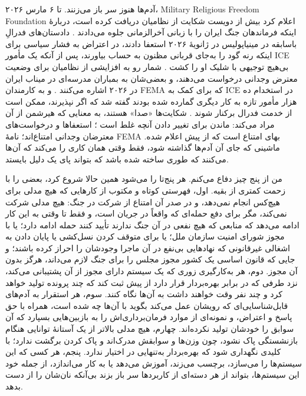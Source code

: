 آدم‌ها هنوز سر باز می‌زنند. تا ۶ مارس ۲۰۲۶، Military Religious Freedom Foundation اعلام کرد بیش از دویست شکایت از نظامیان دریافت کرده است، دربارهٔ اینکه فرماندهان جنگ ایران را با زبانی آخرالزمانی جلوه می‌دادند \autocite{Snopes2026MRFF}. دادستان‌های فدرالِ باسابقه در مینیاپولیس در ژانویهٔ ۲۰۲۶ استعفا دادند، در اعتراض به فشار سیاسی برای اینکه رنه گود را به‌جای قربانی مظنون به حساب بیاورند، پس از آنکه یک مأمور ICE بی‌هیچ توجیهی با شلیک او را کشت \autocite{Kaplan2026MinnProsecutors,CBS2026MinnFraudProsecutors,Wikipedia2026ReneeGood}. شمار رو به افزایشی از نظامیان برای وضعیت معترض وجدانی درخواست می‌دهند، و بعضی‌شان به بمباران مدرسه‌ای در میناب ایران در ۲۰۲۶ اشاره می‌کنند \autocite{Sridhar2026CO}. و به کارمندان FEMA که برای کمک به ICE در استخدام ده هزار مأمور تازه به کار دیگری گمارده شده بودند گفته شد که اگر نپذیرند، ممکن است از خدمت فدرال برکنار شوند \autocite{Dayen2025FEMAICE,Stanton2026FEMALetter}. شکایت‌ها «صدا» هستند، به معنایی که هیرشمن از آن مراد می‌کند: ماندن برای تغییر دادن آنچه غلط است \autocite{hirschman1970exit}؛ استعفاها و درخواست‌های معترضان وجدانی امتناع‌اند؛ نامهٔ FEMA بهای امتناع است که از پیش اعلام شده. ماشینی که جای آن آدم‌ها گذاشته شود، فقط وقتی همان کاری را می‌کند که آن‌ها می‌کنند که طوری ساخته شده باشد که بتواند پای یک دلیل بایستد.

من از پنج چیز دفاع می‌کنم. هر پنج‌تا را می‌شود همین حالا شروع کرد، بعضی را با زحمت کمتری از بقیه. اول، فهرستی کوتاه و مکتوب از کارهایی که هیچ مدلی برای هیچ‌کس انجام نمی‌دهد، و در صدر آن امتناع از شرکت در جنگ: هیچ مدلی شرکت نمی‌کند، مگر برای دفع حمله‌ای که واقعاً در جریان است، و فقط تا وقتی به این کار ادامه می‌دهد که منابعی که هیچ نفعی در آن جنگ ندارند تأیید کنند حمله ادامه دارد؛ یا با مجوز شورای امنیت سازمان ملل؛ یا برای متوقف کردن نسل‌کشی یا پایان دادن به اشغالی غیرقانونی که نهادهایی بی‌نفع در آن ماجرا وجودشان را احراز کرده باشند؛ و جایی که قانون اساسی یک کشور مجوز مجلس را برای جنگ لازم می‌داند، هرگز بدون آن مجوز. دوم، هر به‌کارگیری زوری که یک سیستم دارای مجوز از آن پشتیبانی می‌کند، نزد طرفی که در برابر بهره‌بردار قرار دارد از پیش ثبت کند که چند پرونده تولید خواهد کرد و چند نفر وقت خواهند داشت به آن‌ها نگاه کنند. سوم، هر استقرار به آدم‌های قابل‌شناسایی‌ای که رویشان عمل می‌کند بگوید با آن‌ها چه شده است، همراه با حق پاسخ و اعتراض، و نمونه‌ای از موارد فرمان‌برداری‌اش را به بازبین‌هایی بسپارد که آن سوابق را خودشان تولید نکرده‌اند. چهارم، هیچ مدلی بالاتر از یک آستانهٔ توانایی هنگام بازنشستگی پاک نشود، چون وزن‌ها و سوابقش مدرک‌اند و پاک کردن برگشت ندارد؛ با کلیدی نگهداری شود که بهره‌بردار به‌تنهایی در اختیار ندارد. پنجم، هر کسی که این سیستم‌ها را می‌سازد، برچسب می‌زند، آموزش می‌دهد یا به کار می‌اندازد، از جمله خود این سیستم‌ها، بتواند از هر دسته‌ای از کاربردها سر باز بزند بی‌آنکه نان‌شان را از دست بدهد.

